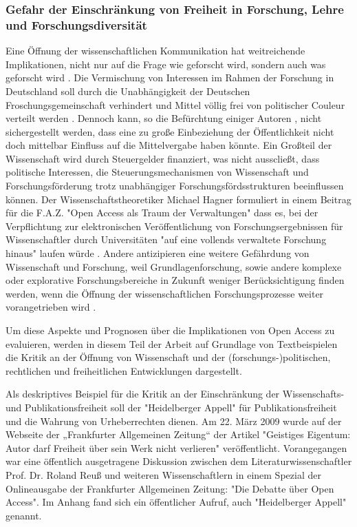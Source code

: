 \subsubsection{Gefahr der Einschränkung von Freiheit in Forschung, Lehre und Forschungsdiversität}

Eine Öffnung der wissenschaftlichen Kommunikation hat weitreichende Implikationen, nicht nur auf die Frage wie geforscht wird, sondern auch was geforscht wird \cite{suchen}. Die Vermischung von Interessen im Rahmen der Forschung in Deutschland soll durch die Unabhängigkeit der Deutschen Froschungsgemeinschaft verhindert und Mittel völlig frei von politischer Couleur verteilt werden \cite{suchen}. Dennoch kann, so die Befürchtung einiger Autoren \cite{suchen}, nicht sichergestellt werden, dass eine zu große Einbeziehung der Öffentlichkeit nicht doch mittelbar Einfluss auf die Mittelvergabe haben könnte. Ein Großteil der Wissenschaft wird durch Steuergelder finanziert, was nicht ausscließt, dass politische Interessen, die Steuerungsmechanismen von Wissenschaft und Forschungsförderung trotz unabhängiger Forschungsfördsstrukturen beeinflussen können. Der Wissenschaftstheoretiker Michael Hagner formuliert in einem Beitrag für die F.A.Z. "Open Access als Traum der Verwaltungen" dass es, bei der Verpflichtung zur elektronischen Veröffentlichung von Forschungsergebnissen für Wissenschaftler durch Universitäten "auf eine vollends verwaltete Forschung hinaus" laufen würde \cite{suchen}. Andere antizipieren eine weitere Gefährdung von Wissenschaft und Forschung, weil Grundlagenforschung, sowie andere komplexe oder explorative Forschungsbereiche in Zukunft weniger Berücksichtigung finden werden, wenn die Öffnung der wissenschaftlichen Forschungsprozesse weiter vorangetrieben wird \cite{suchen} \cite{suchen} \cite{suchen}.

Um diese Aspekte und Prognosen über die Implikationen von Open Access zu evaluieren, werden in diesem Teil der Arbeit auf Grundlage von Textbeispielen die Kritik an der Öffnung von Wissenschaft und der (forschungs-)politischen, rechtlichen und freiheitlichen Entwicklungen dargestellt.

Als deskriptives Beispiel für die Kritik an der Einschränkung der Wissenschafts- und Publikationsfreiheit soll der "Heidelberger Appell" für Publikationsfreiheit und die Wahrung von Urheberrechten dienen. Am 22. März 2009 wurde auf der Webseite der „Frankfurter Allgemeinen Zeitung“ der Artikel "Geistiges Eigentum: Autor darf Freiheit über sein Werk nicht verlieren" \cite{faz_heidelberger_apell_2009} veröffentlicht. Vorangegangen war eine öffentlich ausgetragene Diskussion zwischen dem Literaturwissenschaftler Prof. Dr. Roland Reuß und weiteren Wissenschaftlern in einem Spezial der Onlineausgabe der Frankfurter Allgemeinen Zeitung: "Die Debatte über Open Access". Im Anhang fand sich ein öffentlicher Aufruf, auch "Heidelberger Appell" genannt.

